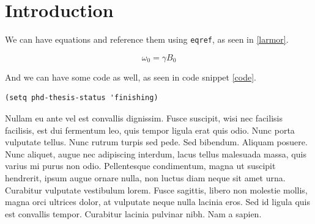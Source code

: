 \documentclass[a4paper,12pt,oneside,print,numbered,index,PageStyleIII]{PhDThesisPSnPDF}
\date{}
\title{}
\begin{document}
\frontmatter

\begin{titlepage}

\maketitle

\end{titlepage}


%










\tableofcontents

\listoffigures

\listoftables

\mainmatter


\chapter{Introduction}
\label{sec:org35fe2dd}
\label{ch:Intro}

We can have equations and reference them using \texttt{eqref}, as seen in \eqref{larmor}.

\begin{equation}
\omega_{0} = \gamma B_{0} \label{larmor}
\end{equation}


And we can have some code as well, as seen in code snippet \ref{code}.

\begin{verbatim}
(setq phd-thesis-status 'finishing)
\end{verbatim}


Nullam eu ante vel est convallis dignissim.  Fusce suscipit, wisi nec facilisis facilisis, est dui fermentum leo, quis tempor ligula erat quis odio.  Nunc porta vulputate tellus.  Nunc rutrum turpis sed pede.  Sed bibendum.  Aliquam posuere.  Nunc aliquet, augue nec adipiscing interdum, lacus tellus malesuada massa, quis varius mi purus non odio.  Pellentesque condimentum, magna ut suscipit hendrerit, ipsum augue ornare nulla, non luctus diam neque sit amet urna.  Curabitur vulputate vestibulum lorem.  Fusce sagittis, libero non molestie mollis, magna orci ultrices dolor, at vulputate neque nulla lacinia eros.  Sed id ligula quis est convallis tempor.  Curabitur lacinia pulvinar nibh.  Nam a sapien.
\end{document}
